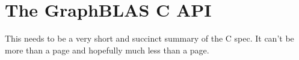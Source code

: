 %
%

\section{The GraphBLAS C API}
\label{sec:GrBCspec}
This needs to be a very short and succinct summary of the C spec.  It can't be more than a page and hopefully much less than a page.